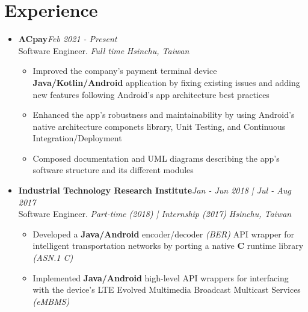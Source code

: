 \section{\sectionheading Experience}

\begin{itemize}[leftmargin=0pt, label={}]%

\item{
{\sectionheading\large{\textbf{ACpay}}}\hfill {\sectionheading\small{\textit{Feb 2021 - Present}}}\\
{\sectionheading\small{Software Engineer. \textit{Full time}}}\hfill
{\sectionheading\small{\textit{Hsinchu, Taiwan}}}

    \vspace{-6pt}
    \begin{itemize}[label=\textbullet, leftmargin=*, noitemsep]
        \item{Improved the company's payment terminal device \textbf{Java/Kotlin/Android} application by fixing existing issues and adding new features following Android's app architecture best practices}
        \item{Enhanced the app's robustness and maintainability by using Android's native architecture componets library, Unit Testing, and Continuous Integration/Deployment}
        \item{Composed documentation and UML diagrams describing the app's software structure and its different modules}
    \end{itemize}
}

\item{
{\sectionheading\large{\textbf{Industrial Technology Research Institute}}}\hfill {\sectionheading\small{\textit{Jan - Jun 2018 | Jul - Aug 2017}}}\\
{\sectionheading\small{Software Engineer. \textit{Part-time (2018) | Internship (2017)}}}\hfill
{\sectionheading\small{\textit{Hsinchu, Taiwan}}}

    \vspace{-6pt}
    \begin{itemize}[label=\textbullet, leftmargin=*, noitemsep]
        \item{Developed a \textbf{Java/Android} encoder/decoder \textit{(BER)} API wrapper for intelligent transportation networks by porting a native \textbf{C} runtime library \textit{(ASN.1 C)}}
        \item{Implemented \textbf{Java/Android} high-level API wrappers for interfacing with the device's LTE Evolved Multimedia Broadcast Multicast Services \textit{(eMBMS)}}
    \end{itemize}
}


\end{itemize}
